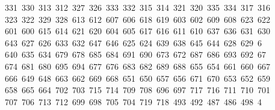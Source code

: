 \begin{tabbing}
\ 331\ 330\ 313\ 312\ 327\ 326\ 333\ 332\ 315\ 314\ 321\ 320\ 335\ 334\ 317\ 316\\[0pt]
\>\ 323\ 322\ 329\ 328\ 613\ 612\ 607\ 606\ 618\ 619\ 603\ 602\ 609\ 608\ 623\ 622\\[0pt]
\>\ 601\ 600\ 615\ 614\ 621\ 620\ 604\ 605\ 617\ 616\ 611\ 610\ 637\ 636\ 631\ 630\ \\[0pt]
\ 643\ 627\ 626\ 633\ 632\ 647\ 646\ 625\ 624\ 639\ 638\ 645\ 644\ 628\ 629\ 6\\[0pt]
\ 640\ 635\ 634\ 679\ 678\ 685\ 684\ 691\ 690\ 673\ 672\ 687\ 686\ 693\ 692\ 67\\[0pt]
\ 674\ 681\ 680\ 695\ 694\ 677\ 676\ 683\ 682\ 689\ 688\ 655\ 654\ 661\ 660\ 667\\[0pt]
\>\ 666\ 649\ 648\ 663\ 662\ 669\ 668\ 651\ 650\ 657\ 656\ 671\ 670\ 653\ 652\ 659\\[0pt]
\>\ 658\ 665\ 664\ 702\ 703\ 715\ 714\ 709\ 708\ 696\ 697\ 717\ 716\ 711\ 710\ 701\ \\[0pt]
\ 707\ 706\ 713\ 712\ 699\ 698\ 705\ 704\ 719\ 718\ 493\ 492\ 487\ 486\ 498\ 4\\[0pt]

\end{tabbing}
